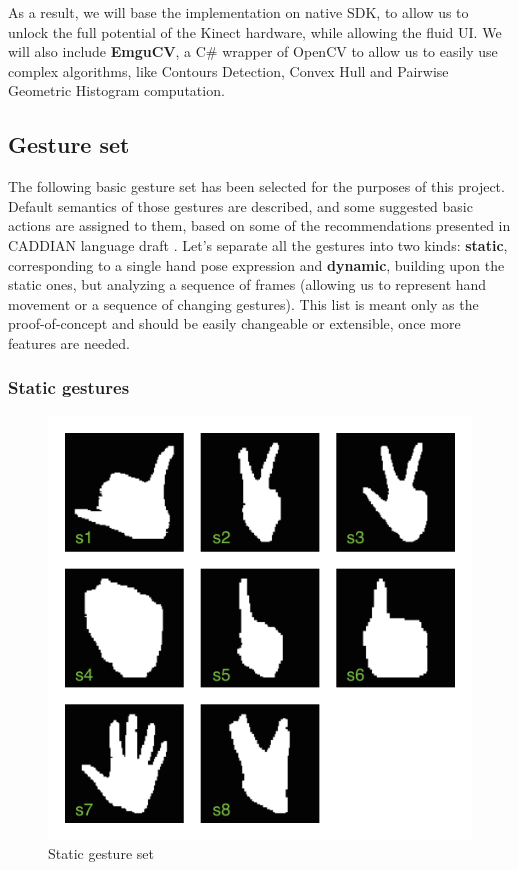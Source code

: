 \documentclass[a4paper,11pt,oneside]{article}
\begin{document}
As a result, we will base the implementation on native SDK, to allow us to unlock the full potential of the Kinect hardware, while allowing the fluid UI. We will also include \textbf{EmguCV}, a C\# wrapper of OpenCV to allow us to easily use complex algorithms, like Contours Detection, Convex Hull and Pairwise Geometric Histogram computation.

\subsection{Gesture set}

The following basic gesture set has been selected for the purposes of this project. Default semantics of those gestures are described, and some suggested basic actions are assigned to them, based on some of the recommendations presented in CADDIAN language draft \cite{AB01}. Let's separate all the gestures into two kinds: \textbf{static}, corresponding to a single hand pose expression and \textbf{dynamic},  building upon the static ones, but analyzing a sequence of frames (allowing us to represent hand movement or a sequence of changing gestures). This list is meant only as the proof-of-concept and should be easily changeable or extensible, once more features are needed.
  
  \subsubsection{Static gestures}

\begin{figure}[H]
\centering
\includegraphics[scale=0.6]{static-gestureset.png}
\caption{Static gesture set}
\end{figure}
  
\end{document}
